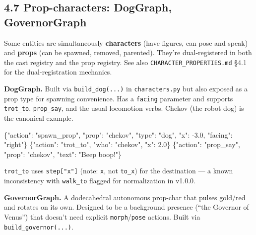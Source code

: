 \documentclass[
  11pt,
]{book}
\newenvironment{Shaded}{}{}
\newcommand{\DataTypeTok}[1]{\textcolor[rgb]{0.56,0.13,0.00}{#1}}
\newcommand{\FloatTok}[1]{\textcolor[rgb]{0.25,0.63,0.44}{#1}}
\newcommand{\FunctionTok}[1]{\textcolor[rgb]{0.02,0.16,0.49}{#1}}
\newcommand{\StringTok}[1]{\textcolor[rgb]{0.25,0.44,0.63}{#1}}
\begin{document}
\subsection{4.7 Prop-characters: DogGraph,
GovernorGraph}\label{prop-characters-doggraph-governorgraph}

Some entities are simultaneously \textbf{characters} (have figures, can
pose and speak) and \textbf{props} (can be spawned, removed, parented).
They're dual-registered in both the cast registry and the prop registry.
See also \texttt{CHARACTER\_PROPERTIES.md} §4.1 for the
dual-registration mechanics.

\textbf{DogGraph.} Built via \texttt{build\_dog(...)} in
\texttt{characters.py} but also exposed as a prop type for spawning
convenience. Has a \texttt{facing} parameter and supports
\texttt{trot\_to}, \texttt{prop\_say}, and the usual locomotion verbs.
Chekov (the robot dog) is the canonical example.

\begin{Shaded}
\begin{Highlighting}[]
\FunctionTok{\{}\DataTypeTok{"action"}\FunctionTok{:} \StringTok{"spawn\_prop"}\FunctionTok{,} \DataTypeTok{"prop"}\FunctionTok{:} \StringTok{"chekov"}\FunctionTok{,}
 \DataTypeTok{"type"}\FunctionTok{:} \StringTok{"dog"}\FunctionTok{,} \DataTypeTok{"x"}\FunctionTok{:} \FloatTok{{-}3.0}\FunctionTok{,} \DataTypeTok{"facing"}\FunctionTok{:} \StringTok{"right"}\FunctionTok{\}}
\FunctionTok{\{}\DataTypeTok{"action"}\FunctionTok{:} \StringTok{"trot\_to"}\FunctionTok{,} \DataTypeTok{"who"}\FunctionTok{:} \StringTok{"chekov"}\FunctionTok{,} \DataTypeTok{"x"}\FunctionTok{:} \FloatTok{2.0}\FunctionTok{\}}
\FunctionTok{\{}\DataTypeTok{"action"}\FunctionTok{:} \StringTok{"prop\_say"}\FunctionTok{,} \DataTypeTok{"prop"}\FunctionTok{:} \StringTok{"chekov"}\FunctionTok{,} \DataTypeTok{"text"}\FunctionTok{:} \StringTok{"Beep boop!"}\FunctionTok{\}}
\end{Highlighting}
\end{Shaded}

\texttt{trot\_to} uses \texttt{step{[}"x"{]}} (note: \texttt{x}, not
\texttt{to\_x}) for the destination --- a known inconsistency with
\texttt{walk\_to} flagged for normalization in v1.0.0.

\textbf{GovernorGraph.} A dodecahedral autonomous prop-char that pulses
gold/red and rotates on its own. Designed to be a background presence
(``the Governor of Venus'') that doesn't need explicit
\texttt{morph}/\texttt{pose} actions. Built via
\texttt{build\_governor(...)}.
\end{document}
